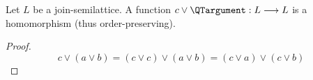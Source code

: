 \newcommand{\LTCnegA}{\LTCnegNP{A}}
\newcommand{\LTCdnegA}{\LTCnegNP{\LTCnegNP{A}}}
\newcommand{\LTCnegB}{\LTCnegNP{B}}
\newcommand{\LTCimpAA}{\LTCimpNP{A}{A}}
\newcommand{\LTCimpAB}{\LTCimpNP{A}{B}}
\newcommand{\LTCimpAC}{\LTCimpNP{A}{C}}
\newcommand{\LTCimpAD}{\LTCimpNP{A}{D}}
\newcommand{\LTCimpBA}{\LTCimpNP{B}{A}}
\newcommand{\LTCimpBB}{\LTCimpNP{B}{B}}
\newcommand{\LTCimpBC}{\LTCimpNP{B}{C}}
\newcommand{\LTCimpBD}{\LTCimpNP{B}{D}}
\newcommand{\LTCimpCA}{\LTCimpNP{C}{A}}
\newcommand{\LTCimpCB}{\LTCimpNP{C}{B}}
\newcommand{\LTCimpCD}{\LTCimpNP{C}{D}}
\newcommand{\LTCimpABC}{\LTCimpNP{A}{(\LTCimpBC)}}
\newcommand{\LTCimpBAC}{\LTCimpNP{B}{(\LTCimpAC)}}
\newcommand{\LTCimpAAA}{\LTCimpNP{A}{(\LTCimpAA)}}
\newcommand{\LTCimpABA}{\LTCimpNP{A}{(\LTCimpBA)}}
\newcommand{\LTCimpBAB}{\LTCimpNP{B}{(\LTCimpAB)}}
\newcommand{\LTCimpOneTwoThree}[3] {\LTCimpNP{#1} {\LTCimpP{#2}{#3}}}
\newcommand{\LTCimpOneTwoThreeP}[3]{(\LTCimpOneTwoThree{#1}{#2}{#3})}
\newcommand{\LTCmeetAB}{\LTCmeetNP{A}{B}}
\newcommand{\LTCmeetAC}{\LTCmeetNP{A}{C}}
\newcommand{\LTCmeetBD}{\LTCmeetNP{B}{D}}
\newcommand{\LTCmeetCD}{\LTCmeetNP{C}{D}}
\newcommand{\LTCjoinAB}{\LTCjoinNP{A}{B}}
\newcommand{\LTCotimesAB}{\LTCotimesNP{A}{B}}
\newcommand{\LTCmeetimpOneTwoThree}[3]{\LTCimpNP{\LTCmeetP{#1}{#2}}	{#3}}
\newcommand{\LTCmeetimpABC}{\LTCmeetimpOneTwoThree{A}{B}{C}}
\newcommand{\LTCnegNP}[1]{\LTCneg #1}

\newcommand{\LTCimpNP}[2]{#1 \LTCimp #2}
\newcommand{\LTCimpP}[2]{(\LTCimpNP{#1}{#2})}
\newcommand{\LTCmeetNP}[2]{#1 \LTCmeet #2}
\newcommand{\LTCmeetP}[2]{(\LTCmeetNP{#1}{#2})}
\newcommand{\LTCjoinNP}[2]{#1 \LTCjoin #2}
\newcommand{\LTCjoinP}[2]{(\LTCjoinNP{#1}{#2})}
\newcommand{\LTCotimesNP}[2]{#1 \LTCotimes #2}
\newcommand{\LTCotimesP}[2]{(\LTCotimesNP{#1}{#2})}



\newcommand{\LTCeqNP}[2]{#1 \LTCeq #2}
\newcommand{\LTCeqP}[2]{(\LTCeqNP{#1}{#2})}



\begin{proposition}\label{joinEndomorphism}
Let $L$ be a join-semilattice. 
A function $c \vee \QTargument : L \longrightarrow L $
is a homomorphism (thus order-preserving). 
\end{proposition}
\begin{proof}
\[c \vee (a \vee b) =  (c \vee c) \vee (a \vee b) = (c \vee a) \vee (c \vee b) \]
\end{proof}



